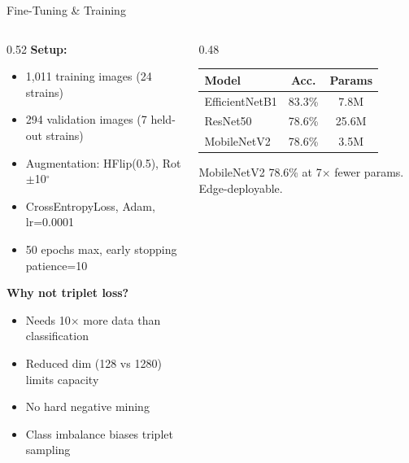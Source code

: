 \documentclass[aspectratio=169]{beamer}
\begin{document}
\begin{frame}{Fine-Tuning \& Training}
  \begin{columns}[T]
    \begin{column}{0.52\textwidth}
      \textbf{Setup:}
      \begin{itemize}
        \item 1,011 training images (24 strains)
        \item 294 validation images (7 held-out strains)
        \item Augmentation: HFlip(0.5), Rot$\pm$10$^\circ$
        \item CrossEntropyLoss, Adam, lr=0.0001
        \item 50 epochs max, early stopping patience=10
      \end{itemize}

      \textbf{Why not triplet loss?}
      \begin{itemize}
        \item Needs 10$\times$ more data than classification
        \item Reduced dim (128 vs 1280) limits capacity
        \item No hard negative mining
        \item Class imbalance biases triplet sampling
      \end{itemize}
    \end{column}
    \begin{column}{0.48\textwidth}
      \begin{table}
        \centering
        \small
        \begin{tabular}{@{}lcc@{}}
          \toprule
          \textbf{Model} & \textbf{Acc.} & \textbf{Params} \\
          \midrule
          EfficientNetB1 & 83.3\% & 7.8M \\
          ResNet50 & 78.6\% & 25.6M \\
          MobileNetV2 & 78.6\% & 3.5M \\
          \bottomrule
        \end{tabular}
      \end{table}
      \begin{block}{MobileNetV2}
        78.6\% at 7$\times$ fewer params. Edge-deployable.
      \end{block}
    \end{column}
  \end{columns}
\end{frame}
\end{document}
